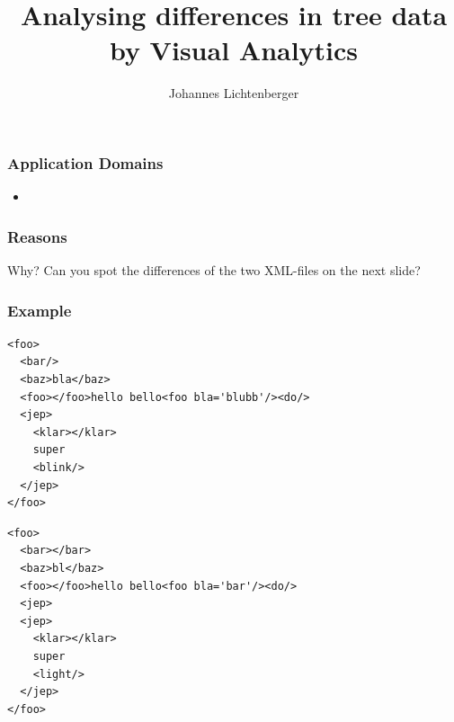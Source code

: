 \documentclass{beamer}
\title{Analysing differences in tree data by Visual Analytics}
\author{Johannes Lichtenberger}\institute{Distributed Systems Group}
\begin{document}
\begin{frame}
\titlepage
\end{frame}

\begin{frame}
\frametitle{Application Domains}
\begin{itemize}
\item 
\end{itemize}
\end{frame}

\begin{frame}
\frametitle{Reasons}
\begin{block}{Why?}
Can you spot the differences of the two XML-files on the next slide?
\end{block}
\end{frame}

\begin{frame}[fragile]
\frametitle{Example}
\begin{lstlisting}[caption=first revision, frame=trBL]
<foo>
  <bar/>
  <baz>bla</baz>
  <foo></foo>hello bello<foo bla='blubb'/><do/>
  <jep>
    <klar></klar>
    super
    <blink/>
  </jep>
</foo>
\end{lstlisting}
\begin{lstlisting}[caption=second revision, frame=trBL]
<foo>
  <bar></bar>
  <baz>bl</baz>
  <foo></foo>hello bello<foo bla='bar'/><do/>
  <jep>
  <jep>
    <klar></klar>
    super
    <light/>
  </jep>
</foo>
\end{lstlisting}
\end{frame}


\end{document}
